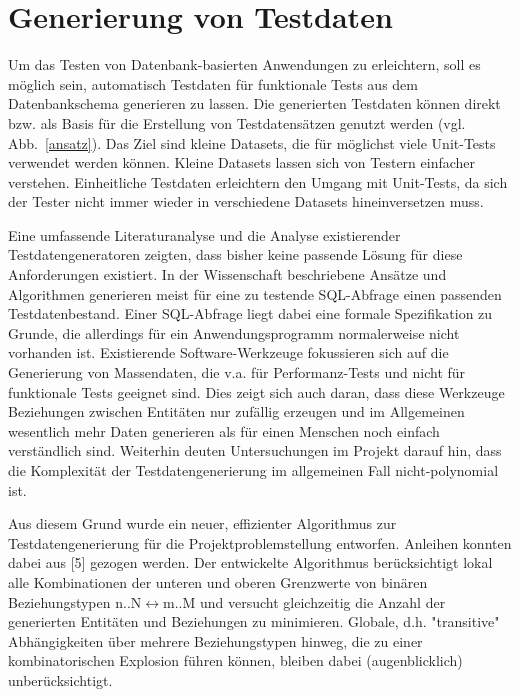 \section{Generierung von Testdaten}

Um das Testen von Datenbank-basierten Anwendungen zu erleichtern, soll es möglich sein, automatisch Testdaten für funktionale Tests aus dem Datenbankschema generieren zu lassen. Die generierten Testdaten können direkt bzw. als Basis für die Erstellung von Testdatensätzen genutzt werden (vgl. Abb.~\ref{ansatz}). Das Ziel sind kleine Datasets, die für möglichst viele Unit-Tests verwendet werden können. Kleine Datasets lassen sich von Testern einfacher verstehen. Einheitliche Testdaten erleichtern den Umgang mit Unit-Tests, da sich der Tester nicht immer wieder in verschiedene Datasets hineinversetzen muss.

Eine umfassende Literaturanalyse und die Analyse existierender Testdatengeneratoren zeigten, dass bisher keine passende Lösung für diese Anforderungen existiert. 
In der Wissenschaft beschriebene Ansätze und Algorithmen generieren meist für eine zu testende SQL-Abfrage einen passenden Testdatenbestand. Einer SQL-Abfrage liegt dabei eine formale Spezifikation zu Grunde, die allerdings für ein Anwendungsprogramm normalerweise nicht vorhanden ist. Existierende Software-Werkzeuge fokussieren sich auf die Generierung von Massendaten, die v.a. für Performanz-Tests und nicht für funktionale Tests geeignet sind. Dies zeigt sich auch daran, dass diese Werkzeuge Beziehungen zwischen Entitäten nur zufällig erzeugen und im Allgemeinen wesentlich mehr Daten generieren als für einen Menschen noch einfach verständlich sind. Weiterhin deuten Untersuchungen im Projekt darauf hin, dass die Komplexität der Testdatengenerierung im allgemeinen Fall nicht-polynomial ist.

Aus diesem Grund wurde ein neuer, effizienter Algorithmus zur Testdatengenerierung für die Projektproblemstellung entworfen. Anleihen konnten dabei aus [5] gezogen werden. Der entwickelte Algorithmus berücksichtigt lokal alle Kombinationen der unteren und oberen Grenzwerte von binären Beziehungstypen n..N$\leftrightarrow$m..M und versucht gleichzeitig die Anzahl der generierten Entitäten und Beziehungen zu minimieren. Globale, d.h. "transitive" Abhängigkeiten über mehrere Beziehungstypen hinweg, die zu einer kombinatorischen Explosion führen können, bleiben dabei (augenblicklich) unberücksichtigt. 

%

